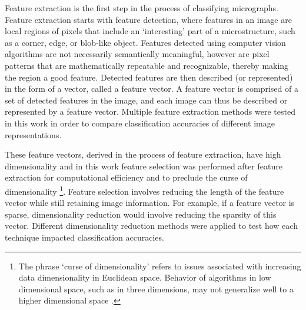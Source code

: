Feature extraction is the first step in the process of classifying micrographs.  Feature extraction starts with feature detection, where features in an image are local regions of pixels that include an `interesting' part of a microstructure, such as a corner, edge, or blob-like object. Features detected using computer vision algorithms are not necessarily semantically meaningful, however are pixel patterns that are mathematically repeatable and recognizable, thereby making the region a good feature. Detected features are then described (or represented) in the form of a vector, called a feature vector. A feature vector is comprised of a set of detected features in the image, and each image can thus be described or represented by a feature vector.  Multiple feature extraction methods were tested in this work in order to compare classification accuracies of different image representations.   
%

These feature vectors, derived in the process of feature extraction, have high dimensionality and in this work feature selection was performed after feature extraction for computational efficiency and to preclude the curse of dimensionality \footnote{The phrase `curse of dimensionality' refers to issues associated with increasing data dimensionality in Euclidean space.  Behavior of algorithms in low dimensional space, such as in three dimensions, may not generalize well to a higher dimensional space \cite{Keogh2010}.}.  Feature selection involves reducing the length of the feature vector while still retaining image information.  For example, if a feature vector is sparse, dimensionality reduction would involve reducing the sparsity of this vector.  Different dimensionality reduction methods were applied to test how each technique impacted classification accuracies.   

